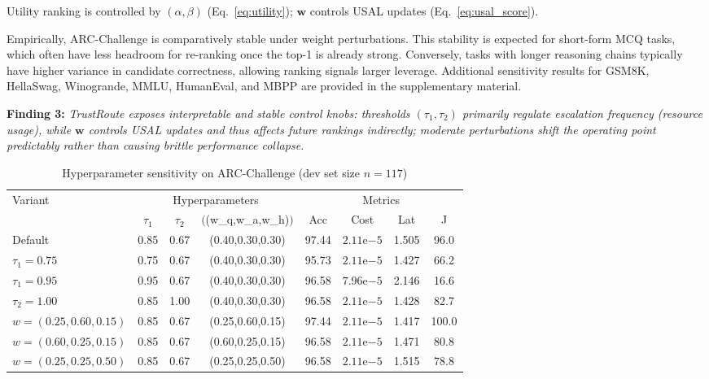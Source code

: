 \documentclass[acmsmall,screen,review,anonymous]{acmart}
\begin{document}
Utility ranking is controlled by $(\alpha,\beta)$ (Eq.~\ref{eq:utility}); $\mathbf{w}$ controls USAL updates (Eq.~\ref{eq:usal_score}).


Empirically, ARC-Challenge is comparatively stable under weight perturbations.
This stability is expected for short-form MCQ tasks, which often have less headroom for re-ranking once the top-1 is already strong.
Conversely, tasks with longer reasoning chains typically have higher variance in candidate correctness, allowing ranking signals larger leverage.
\noindent Additional sensitivity results for GSM8K, HellaSwag, Winogrande, MMLU, HumanEval, and MBPP are provided in the supplementary material.

\begin{findingbox}
\textbf{Finding 3:} \textit{TrustRoute exposes interpretable and stable control knobs: thresholds $(\tau_1,\tau_2)$ primarily regulate escalation frequency (resource usage), while $\mathbf{w}$ controls USAL updates and thus affects future rankings indirectly; moderate perturbations shift the operating point predictably rather than causing brittle performance collapse.}
\end{findingbox}


\begin{table}[h]
\centering
\caption{Hyperparameter sensitivity on ARC-Challenge (dev set size $n=117$)}
\label{tab:ablate-arcchallenge}
\small
\setlength\tabcolsep{4pt}
\begin{tabular}{lccc cccc}
\toprule
\multirow{2}{*}{Variant} & \multicolumn{3}{c}{Hyperparameters} & \multicolumn{4}{c}{Metrics} \\
\cmidrule(lr){2-4}\cmidrule(lr){5-8}
 & $\tau_1$ & $\tau_2$ & $($(w_q,w_a,w_h)$)$ & Acc & Cost & Lat & J \\
\midrule
Default              & 0.85 & 0.67 & (0.40,0.30,0.30) & 97.44 & $2.11\mathrm{e}{-5}$ & 1.505 & 96.0 \\
$\tau_1=0.75$        & 0.75 & 0.67 & (0.40,0.30,0.30) & 95.73 & $2.11\mathrm{e}{-5}$ & 1.427 & 66.2 \\
$\tau_1=0.95$        & 0.95 & 0.67 & (0.40,0.30,0.30) & 96.58 & $7.96\mathrm{e}{-5}$ & 2.146 & 16.6 \\
$\tau_2=1.00$        & 0.85 & 1.00 & (0.40,0.30,0.30) & 96.58 & $2.11\mathrm{e}{-5}$ & 1.428 & 82.7 \\
$w=(0.25,0.60,0.15)$ & 0.85 & 0.67 & (0.25,0.60,0.15) & 97.44 & $2.11\mathrm{e}{-5}$ & 1.417 & 100.0 \\
$w=(0.60,0.25,0.15)$ & 0.85 & 0.67 & (0.60,0.25,0.15) & 96.58 & $2.11\mathrm{e}{-5}$ & 1.471 & 80.8 \\
$w=(0.25,0.25,0.50)$ & 0.85 & 0.67 & (0.25,0.25,0.50) & 96.58 & $2.11\mathrm{e}{-5}$ & 1.515 & 78.8 \\
\bottomrule
\end{tabular}
\end{table}
\end{document}
